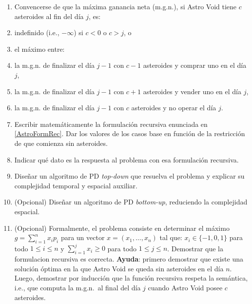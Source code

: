 \begin{enumerate}[label=$\alph*)$,ref=$\alph*)$]
\item Convencerse de que la máxima ganancia neta (m.g.n.), si Astro Void tiene $c$ asteroides al fin del día $j$, es:
 \item indefinido (i.e., $-\infty$) si $c < 0$ o $c > j$, o
 \item el máximo entre:
  \item la m.g.n. de finalizar el día $j-1$ con $c-1$ asteroides y comprar uno en el día $j$,
  \item la m.g.n. de finalizar el día $j-1$ con $c+1$ asteroides y vender uno en el día $j$,
  \item la m.g.n. de finalizar el día $j-1$ con $c$ asteroides y no operar el día $j$.
\label{AstroFormRec}

\item Escribir matemáticamente la formulación recursiva enunciada en \ref{AstroFormRec}. Dar los valores de los casos base en función de la restricción de que comienza sin asteroides.
\item Indicar qué dato es la respuesta al problema con esa formulación recursiva.
\item Diseñar un algoritmo de PD \emph{top-down} que resuelva el problema y explicar su complejidad temporal y espacial auxiliar.
\item (Opcional) Diseñar un algoritmo de PD \emph{bottom-up}, reduciendo la complejidad espacial.
\item (Opcional) Formalmente, el problema consiste en determinar el máximo $g = \sum_{i=1}^n x_i p_i$ para un vector $x = (x_1, \ldots, x_n)$ tal que: $x_i \in \{-1,0,1\}$ para todo $1 \leq i \leq n$ y $\sum_{i=1}^j x_i \geq 0$ para todo $1 \leq j \leq n$.  Demostrar que la formulacion recursiva es correcta. \textbf{Ayuda}: primero demostrar que existe una solución óptima en la que Astro Void se queda sin asteroides en el día $n$.  Luego, demostrar por inducción que la función recursiva respeta la semántica, i.e., que computa la m.g.n.\ al final del día $j$ cuando Astro Void posee $c$ asteroides.
\end{enumerate}


